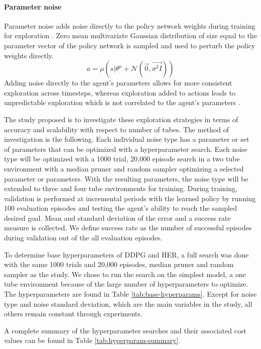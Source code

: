 \paragraph{Parameter noise}
Parameter noise adds noise directly to the policy network weights during training for exploration \cite{plappert2017parameter}. Zero mean multivariate Gaussian distribution of size equal to the parameter vector of the policy network is sampled and used to perturb the policy weights directly.
\begin{equation}
    a = \mu(s | \theta^{\mu} + \mathcal{N} (\Vec{0}, \Vec{\sigma^2 I})) \label{eqn:action-param-noise}
\end{equation}
Adding noise directly to the agent's parameters allows for more consistent exploration across timesteps, whereas exploration added to actions leads to unpredictable exploration which is not correlated to the agent's parameters \cite{plappert2017parameter}.

The study proposed is to investigate these exploration strategies in terms of accuracy and scalability with respect to number of tubes. The method of investigation is the following. Each individual noise type has a parameter or set of parameters that can be optimized with a hyperparameter search. Each noise type will be optimized with a 1000 trial, 20,000 episode search in a two tube environment with a median pruner and random sampler optimizing a selected parameter or parameters. With the resulting parameters, the noise type will be extended to three and four tube environments for training. During training, validation is performed at incremental periods with the learned policy by running 100 evaluation episodes and testing the agent's ability to reach the sampled desired goal. Mean and standard deviation of the error and a success rate measure is collected. We define success rate as the number of successful episodes during validation out of the all evaluation episodes.

To determine base hyperparameters of DDPG and HER, a full search was done with the same 1000 trials and 20,000 episodes, median pruner and random sampler as the study. We chose to run the search on the simplest model, a one tube environment because of the large number of hyperparameters to optimize. The hyperparameters are found in Table \ref{tab:base-hyperparams}. Except for noise type and noise standard deviation, which are the main variables in the study, all others remain constant through experiments.

A complete summary of the hyperparameter searches and their associated cost values can be found in Table \ref{tab:hyperparam-summary}.

